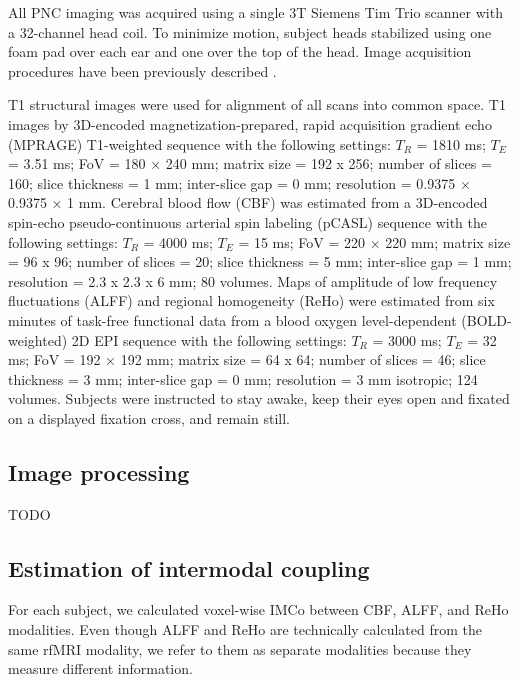 \documentclass[
  12pt,
]{article}
\begin{document}
All PNC imaging was acquired using a single 3T Siemens Tim Trio scanner with a 32-channel head coil. To minimize motion, subject heads stabilized using one foam pad over each ear and one over the top of the head. Image acquisition procedures have been previously described \citep{satterthwaite_neuroimaging_2014}.

T1 structural images were used for alignment of all scans into common space. T1 images by 3D-encoded magnetization-prepared, rapid acquisition gradient echo (MPRAGE) T1-weighted sequence with the following settings: \(T_R\) = 1810 ms; \(T_E\) = 3.51 ms; FoV = 180 × 240 mm; matrix size = 192 x 256; number of slices = 160; slice thickness = 1 mm; inter-slice gap = 0 mm; resolution = 0.9375 × 0.9375 × 1 mm. Cerebral blood flow (CBF) was estimated from a 3D-encoded spin-echo pseudo-continuous arterial spin labeling (pCASL) sequence with the following settings: \(T_R\) = 4000 ms; \(T_E\) = 15 ms; FoV = 220 × 220 mm; matrix size = 96 x 96; number of slices = 20; slice thickness = 5 mm; inter-slice gap = 1 mm; resolution = 2.3 x 2.3 x 6 mm; 80 volumes. Maps of amplitude of low frequency fluctuations (ALFF) and regional homogeneity (ReHo) were estimated from six minutes of task-free functional data from a blood oxygen level-dependent (BOLD-weighted) 2D EPI sequence with the following settings: \(T_R\) = 3000 ms; \(T_E\) = 32 ms; FoV = 192 × 192 mm; matrix size = 64 x 64; number of slices = 46; slice thickness = 3 mm; inter-slice gap = 0 mm; resolution = 3 mm isotropic; 124 volumes. Subjects were instructed to stay awake, keep their eyes open and fixated on a displayed fixation cross, and remain still.

\hypertarget{image-processing}{%
\subsection{Image processing}\label{image-processing}}

TODO

\hypertarget{estimation-of-intermodal-coupling}{%
\subsection{Estimation of intermodal coupling}\label{estimation-of-intermodal-coupling}}

For each subject, we calculated voxel-wise IMCo between CBF, ALFF, and ReHo modalities. Even though ALFF and ReHo are technically calculated from the same rfMRI modality, we refer to them as separate modalities because they measure different information.
\end{document}
